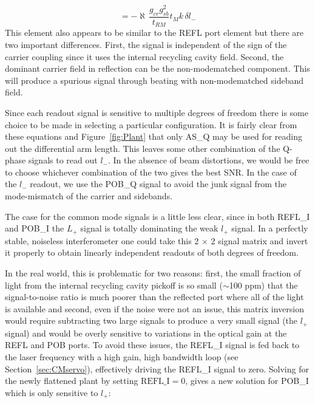 \begin{equation}
[ l_{-} \rightsquigarrow  POB\_Q ] = -\aleph \, \frac{g_{cr} g_{sb}^2}{t_{RM}} t_{M} 
                                      k \, \delta l_{-}
\label{eq:mich2pobq}
\end{equation}
This element also appears to be similar to the REFL port element but there are two
important differences. First, the signal is independent of the sign of the
carrier coupling since it uses the internal recycling cavity field. Second, the
dominant carrier field in reflection can be the non-modematched component. This
will produce a spurious signal through beating with non-modematched sideband
field.

Since each readout signal is sensitive to multiple degrees of freedom there is some
choice to be made in selecting a particular configuration.
It is fairly clear from these equations and Figure~\ref{fig:Plant} that only AS\_Q 
may be used for reading out the differential arm length. This leaves some other 
combination of the Q-phase signals to read out $l_{-}$. In the absence of 
beam distortions, we would be free to choose whichever combination of the two
gives the best SNR. In the case of the $l_-$ readout, we use the POB\_Q signal
to avoid the junk signal from the mode-mismatch of the carrier and sidebands.

The case for the common mode signals is a little less clear, since in both REFL\_I 
and POB\_I the $L_{+}$ signal is totally dominating the weak $l_{+}$ signal. In a 
perfectly stable, noiseless interferometer
one could take this 2 $\times$ 2 signal matrix and invert it properly to
obtain linearly independent readouts of both degrees of freedom. 

In the real world, this is problematic for two reasons: first, the small fraction of 
light  from the internal recycling cavity pickoff is
so small ($\sim$100 ppm) that the signal-to-noise ratio is much poorer than
the reflected port where all of the light is available and second, even if
the noise were not an issue, this matrix inversion would require subtracting two 
large signals
to produce a very small signal (the $l_+$ signal) and would be overly sensitive
to variations in the optical gain at the REFL and POB ports. To avoid these
issues, the REFL\_I signal is fed back to the laser frequency with a high gain, 
high bandwidth loop (see Section~\ref{sec:CMservo}), effectively driving the 
REFL\_I signal 
to zero. Solving for the newly flattened plant by setting $\mbox{REFL\_I} = 0$, 
gives a new solution for POB\_I which is only sensitive to $l_{+}$:

